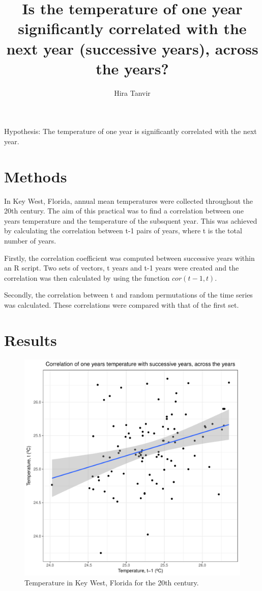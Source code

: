 \documentclass[12pt]{article}
\title{Is the temperature of one year significantly correlated with the next year (successive years), across the years?}
\author{Hira Tanvir}
\begin{document}
	\maketitle
	
Hypothesis: The temperature of one year is significantly correlated with the next year.

\section{Methods}
In Key West, Florida, annual mean temperatures were collected throughout the 20th century. The aim of this practical was to find a correlation between one years temperature and the temperature of the subsquent year. This was achieved by calculating the correlation between t-1 pairs of years, where t is the total number of years. 

Firstly, the correlation coefficient was computed between successive years within an R script. Two sets of vectors, t years and t-1 years were created and the correlation was then calculated by using the function $cor(t-1,t)$.

Secondly, the correlation between t and random permutations of the time series was calculated. These correlations were compared with that of the first set.
\section{Results}	
\begin{figure}[H]
	\centering
\includegraphics[scale=.5]{TAutoCorrGraph.pdf}
	\caption{Temperature in Key West, Florida for the 20th century.}
	\label{fig:TAutoCorrGraph1}
\end{figure}
\end{document}
